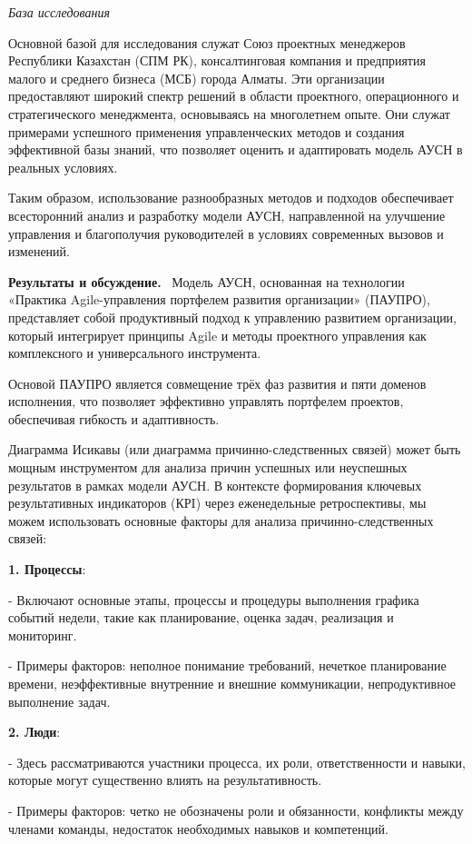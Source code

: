 \begin{multicols}{2}
\emph{База исследования}

Основной базой для исследования служат Союз проектных менеджеров
Республики Казахстан (СПМ РК), консалтинговая компания и предприятия
малого и среднего бизнеса (МСБ) города Алматы. Эти организации
предоставляют широкий спектр решений в области проектного, операционного
и стратегического менеджмента, основываясь на многолетнем опыте. Они
служат примерами успешного применения управленческих методов и создания
эффективной базы знаний, что позволяет оценить и адаптировать модель
АУСН в реальных условиях.

Таким образом, использование разнообразных методов и подходов
обеспечивает всесторонний анализ и разработку модели АУСН, направленной
на улучшение управления и благополучия руководителей в условиях
современных вызовов и изменений.

{\bfseries Результаты и обсуждение.}~ Модель АУСН, основанная на технологии
«Практика Agile-управления портфелем развития организации» (ПАУПРО),
представляет собой продуктивный подход к управлению развитием
организации, который интегрирует принципы Agile и методы проектного
управления как комплексного и универсального инструмента.

Основой ПАУПРО является совмещение трёх фаз развития и пяти доменов
исполнения, что позволяет эффективно управлять портфелем проектов,
обеспечивая гибкость и адаптивность.

Диаграмма Исикавы (или диаграмма причинно-следственных связей) может
быть мощным инструментом для анализа причин успешных или неуспешных
результатов в рамках модели АУСН. В контексте формирования ключевых
результативных индикаторов (КРI) через еженедельные ретроспективы, мы
можем использовать основные факторы для анализа причинно-следственных
связей:

  {\bfseries 1. Процессы}:

  - Включают основные этапы, процессы и процедуры выполнения графика
  событий недели, такие как планирование, оценка задач, реализация и
  мониторинг.

  - Примеры факторов: неполное понимание требований, нечеткое планирование
  времени, неэффективные внутренние и внешние коммуникации,
  непродуктивное выполнение задач.


  {\bfseries 2. Люди}:

  - Здесь рассматриваются участники процесса, их роли, ответственности и
  навыки, которые могут существенно влиять на результативность.

  - Примеры факторов: четко не обозначены роли и обязанности, конфликты
  между членами команды, недостаток необходимых навыков и компетенций.


\end{multicols}
